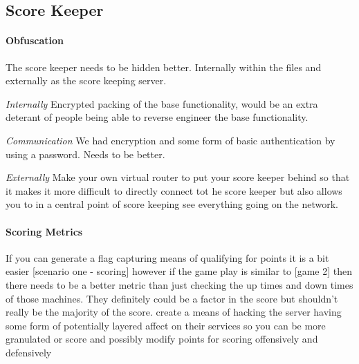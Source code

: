 \documentclass[10pt]{article}
\begin{document}
\subsection{Score Keeper}

\paragraph{Obfuscation}
The score keeper needs to be hidden better. Internally within the files and externally
as the score keeping server.

\textit{Internally}
Encrypted packing of the base functionality, would be an extra deterant of people being
able to reverse engineer the base functionality.

\textit{Communication}
We had encryption and some form of basic authentication by using a password.
Needs to be better.

\textit{Externally}
Make your own virtual router to put your score keeper behind so that it makes it
more difficult to directly connect tot he score keeper but also allows you to in a central
point of score keeping see everything going on the network.

\paragraph{Scoring Metrics}
If you can generate a flag capturing means of qualifying for points it is a bit easier
[scenario one - scoring] however if the game play is similar to [game 2] then there
needs to be a better metric than just checking the up times and down times of those machines.
They definitely could be a factor in the score but shouldn't really be the majority of the score.
create a means of hacking the server having some form of potentially layered affect on their
services so you can be more granulated or score and possibly modify points for scoring
offensively and defensively
\end{document}

